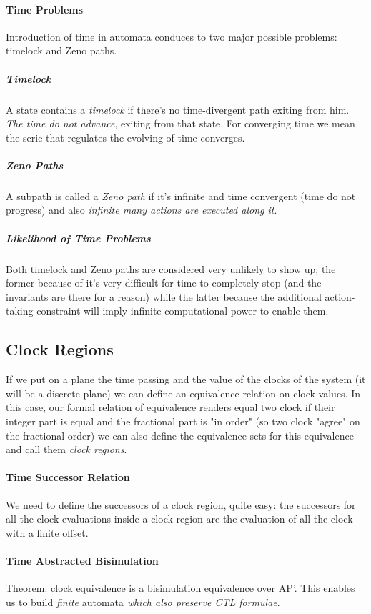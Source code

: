 \documentclass{article}
\begin{document}
			\paragraph{Time Problems}
				Introduction of time in automata conduces to two major possible problems: timelock and Zeno paths.
				
				\subparagraph{Timelock}
					A state contains a \emph{timelock} if there's no time-divergent path exiting from him. \emph{The time do not advance}, exiting from that state. For converging time we mean the serie that regulates the evolving of time converges.
					
				\subparagraph{Zeno Paths}
					A subpath is called a \emph{Zeno path} if it's infinite and time convergent (time do not progress) and also \emph{infinite many actions are executed along it}.
					
				\subparagraph{Likelihood of Time Problems}
					Both timelock and Zeno paths are considered very unlikely to show up; the former because of it's very difficult for time to completely stop (and the invariants are there for a reason) while the latter because the additional action-taking constraint will imply infinite computational power to enable them.
				
			\subsection{Clock Regions}
				If we put on a plane the time passing and the value of the clocks of the system (it will be a discrete plane) we can define an equivalence relation on clock values. In this case, our formal relation of equivalence renders equal two clock if their integer part is equal and the fractional part is "in order" (so two clock "agree" on the fractional order)  we can also define the equivalence sets for this equivalence and call them \emph{clock regions}. 
				
				\paragraph{Time Successor Relation}
					We need to define the successors of a clock region, quite easy: the successors for all the clock evaluations inside a clock region are the evaluation of all the clock with a finite offset. 
					
				\paragraph{Time Abstracted Bisimulation}
					Theorem: clock equivalence is a bisimulation equivalence over AP'. This enables us to build \emph{finite} automata \emph{which also preserve CTL formulae}.
				
\end{document}
